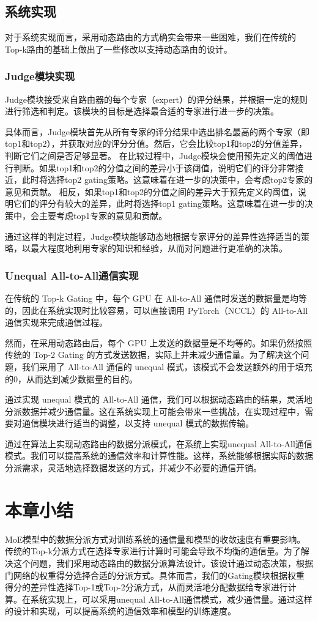\subsection{系统实现}

对于系统实现而言，采用动态路由的方式确实会带来一些困难，我们在传统的Top-k路由的基础上做出了一些修改以支持动态路由的设计。

\subsubsection{Judge模块实现}
Judge模块接受来自路由器的每个专家（expert）的评分结果，并根据一定的规则进行筛选和判定。该模块的目标是选择最合适的专家进行进一步的决策。

具体而言，Judge模块首先从所有专家的评分结果中选出排名最高的两个专家（即top1和top2），并获取对应的评分分值。然后，它会比较top1和top2的分值差异，判断它们之间是否足够显著。
在比较过程中，Judge模块会使用预先定义的阈值进行判断。如果top1和top2的分值之间的差异小于该阈值，说明它们的评分非常接近，此时将选择top2 gating策略。这意味着在进一步的决策中，会考虑top2专家的意见和贡献。
相反，如果top1和top2的分值之间的差异大于预先定义的阈值，说明它们的评分有较大的差异，此时将选择top1 gating策略。这意味着在进一步的决策中，会主要考虑top1专家的意见和贡献。

通过这样的判定过程，Judge模块能够动态地根据专家评分的差异性选择适当的策略，以最大程度地利用专家的知识和经验，从而对问题进行更准确的决策。


\subsubsection{Unequal All-to-All通信实现}
在传统的 Top-k Gating 中，每个 GPU 在 All-to-All 通信时发送的数据量是均等的，因此在系统实现时比较容易，可以直接调用 PyTorch（NCCL）的 All-to-All 通信实现来完成通信过程。

然而，在采用动态路由后，每个 GPU 上发送的数据量是不均等的。如果仍然按照传统的 Top-2 Gating 的方式发送数据，实际上并未减少通信量。为了解决这个问题，我们采用了 All-to-All 通信的 unequal 模式，该模式不会发送额外的用于填充的0，从而达到减少数据量的目的。

通过实现 unequal 模式的 All-to-All 通信，我们可以根据动态路由的结果，灵活地分派数据并减少通信量。这在系统实现上可能会带来一些挑战，在实现过程中，需要对通信模块进行适当的调整，以支持 unequal 模式的数据传输。

通过在算法上实现动态路由的数据分派模式，在系统上实现unequal All-to-All通信模式。我们可以提高系统的通信效率和计算性能。这样，系统能够根据实际的数据分派需求，灵活地选择数据发送的方式，并减少不必要的通信开销。

\section{本章小结}

MoE模型中的数据分派方式对训练系统的通信量和模型的收敛速度有重要影响。传统的Top-k分派方式在选择专家进行计算时可能会导致不均衡的通信量。为了解决这个问题，我们采用动态路由的数据分派算法设计。该设计通过动态决策，根据门网络的权重得分选择合适的分派方式。具体而言，我们的Gating模块根据权重得分的差异性选择Top-1或Top-2分派方式，从而灵活地分配数据给专家进行计算。在系统实现上，可以采用unequal All-to-All通信模式，减少通信量。通过这样的设计和实现，可以提高系统的通信效率和模型的训练速度。

\endinput
